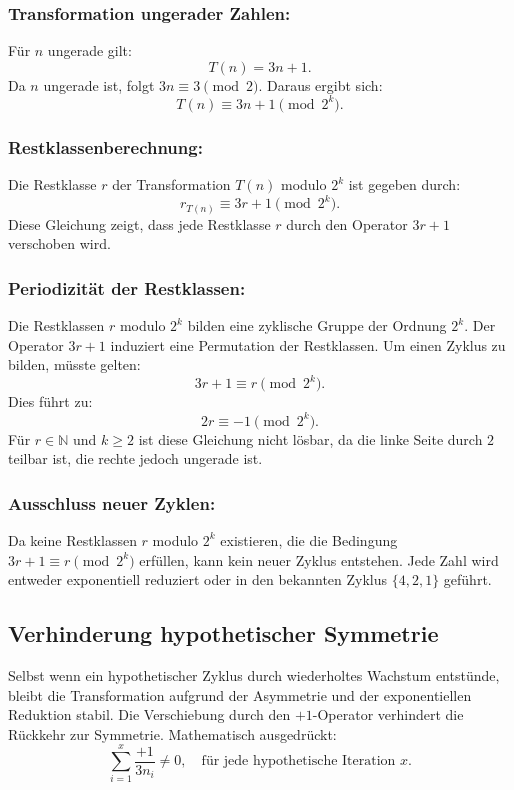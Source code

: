 \documentclass[a4paper,12pt]{article}
\begin{document}
\subsubsection{Transformation ungerader Zahlen:}
   Für \( n \) ungerade gilt:
   \[
   T(n) = 3n + 1.
   \]
   Da \( n \) ungerade ist, folgt \( 3n \equiv 3 \pmod{2} \). Daraus ergibt sich:
   \[
   T(n) \equiv 3n + 1 \pmod{2^k}.
   \]

\subsubsection{Restklassenberechnung:}
   Die Restklasse \( r \) der Transformation \( T(n) \) modulo \( 2^k \) ist gegeben durch:
   \[
   r_{T(n)} \equiv 3r + 1 \pmod{2^k}.
   \]
   Diese Gleichung zeigt, dass jede Restklasse \( r \) durch den Operator \( 3r + 1 \) verschoben wird.

\subsubsection{Periodizität der Restklassen:}
   Die Restklassen \( r \) modulo \( 2^k \) bilden eine zyklische Gruppe der Ordnung \( 2^k \). Der Operator \( 3r + 1 \) induziert eine Permutation der Restklassen. Um einen Zyklus zu bilden, müsste gelten:
   \[
   3r + 1 \equiv r \pmod{2^k}.
   \]
   Dies führt zu:
   \[
   2r \equiv -1 \pmod{2^k}.
   \]
   Für \( r \in \mathbb{N} \) und \( k \geq 2 \) ist diese Gleichung nicht lösbar, da die linke Seite durch \( 2 \) teilbar ist, die rechte jedoch ungerade ist.

\subsubsection{Ausschluss neuer Zyklen:}
   Da keine Restklassen \( r \) modulo \( 2^k \) existieren, die die Bedingung \( 3r + 1 \equiv r \pmod{2^k} \) erfüllen, kann kein neuer Zyklus entstehen. Jede Zahl wird entweder exponentiell reduziert oder in den bekannten Zyklus \( \{4, 2, 1\} \) geführt.

\subsection{Verhinderung hypothetischer Symmetrie}
Selbst wenn ein hypothetischer Zyklus durch wiederholtes Wachstum entstünde, bleibt die Transformation aufgrund der Asymmetrie und der exponentiellen Reduktion stabil. Die Verschiebung durch den \(+1\)-Operator verhindert die Rückkehr zur Symmetrie. Mathematisch ausgedrückt:
\[
\sum_{i=1}^x \frac{+1}{3n_i} \neq 0, \quad \text{für jede hypothetische Iteration } x.
\]
\end{document}

